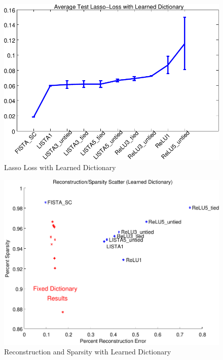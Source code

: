 \begin{figure} \centering
\includegraphics[scale=0.75]{./figures/LISTA/learned_decoder_loss.pdf}
\caption{Lasso Loss with Learned Dictionary} \label{fig:lasso_loss_learned} \end{figure}  

\begin{figure} \centering
\includegraphics[scale=0.75]{./figures/LISTA/learned_decoder_scatter.pdf}
\caption{Reconstruction and Sparsity with Learned Dictionary} \label{fig:scatter_learned} \end{figure}  

